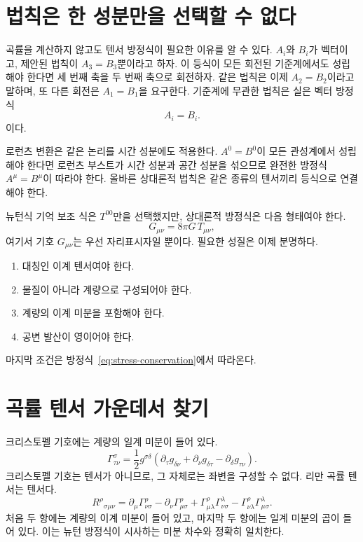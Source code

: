 \section{법칙은 한 성분만을 선택할 수 없다}

곡률을 계산하지 않고도 텐서 방정식이 필요한 이유를 알 수 있다. \(A_i\)와 \(B_i\)가 벡터이고, 제안된 법칙이 \(A_3=B_3\)뿐이라고 하자. 이 등식이 모든 회전된 기준계에서도 성립해야 한다면 세 번째 축을 두 번째 축으로 회전하자. 같은 법칙은 이제 \(A_2=B_2\)이라고 말하며, 또 다른 회전은 \(A_1=B_1\)을 요구한다. 기준계에 무관한 법칙은 실은 벡터 방정식
\begin{equation}
 A_i=B_i.
\end{equation}
이다.

로런츠 변환은 같은 논리를 시간 성분에도 적용한다. \(A^0=B^0\)이 모든 관성계에서 성립해야 한다면 로런츠 부스트가 시간 성분과 공간 성분을 섞으므로 완전한 방정식 \(A^\mu=B^\mu\)이 따라야 한다. 올바른 상대론적 법칙은 같은 종류의 텐서끼리 등식으로 연결해야 한다.

뉴턴식 기억 보조 식은 \(T^{00}\)만을 선택했지만, 상대론적 방정식은 다음 형태여야 한다.
\begin{equation}
 G_{\mu\nu}=8\pi G\,T_{\mu\nu},
 \label{eq:field-schematic}
\end{equation}
여기서 기호 \(G_{\mu\nu}\)는 우선 자리표시자일 뿐이다. 필요한 성질은 이제 분명하다.
\begin{enumerate}
 \item 대칭인 이계 텐서여야 한다.
 \item 물질이 아니라 계량으로 구성되어야 한다.
 \item 계량의 이계 미분을 포함해야 한다.
 \item 공변 발산이 영이어야 한다.
\end{enumerate}
마지막 조건은 방정식~\eqref{eq:stress-conservation}에서 따라온다.

\section{곡률 텐서 가운데서 찾기}

크리스토펠 기호에는 계량의 일계 미분이 들어 있다.
\begin{equation}
 \Gamma^\sigma_{\tau\nu}
 =
 \frac12 g^{\sigma\delta}
 \left(
 \partial_\tau g_{\delta\nu}
 +\partial_\nu g_{\delta\tau}
 -\partial_\delta g_{\tau\nu}
 \right).
 \label{eq:christoffel}
\end{equation}
크리스토펠 기호는 텐서가 아니므로, 그 자체로는 좌변을 구성할 수 없다. 리만 곡률 텐서는 텐서다.
\begin{equation}
 R^\rho{}_{\sigma\mu\nu}
 =
 \partial_\mu\Gamma^\rho_{\nu\sigma}
 -\partial_\nu\Gamma^\rho_{\mu\sigma}
 +\Gamma^\rho_{\mu\lambda}\Gamma^\lambda_{\nu\sigma}
 -\Gamma^\rho_{\nu\lambda}\Gamma^\lambda_{\mu\sigma}.
 \label{eq:riemann}
\end{equation}
처음 두 항에는 계량의 이계 미분이 들어 있고, 마지막 두 항에는 일계 미분의 곱이 들어 있다. 이는 뉴턴 방정식이 시사하는 미분 차수와 정확히 일치한다.

